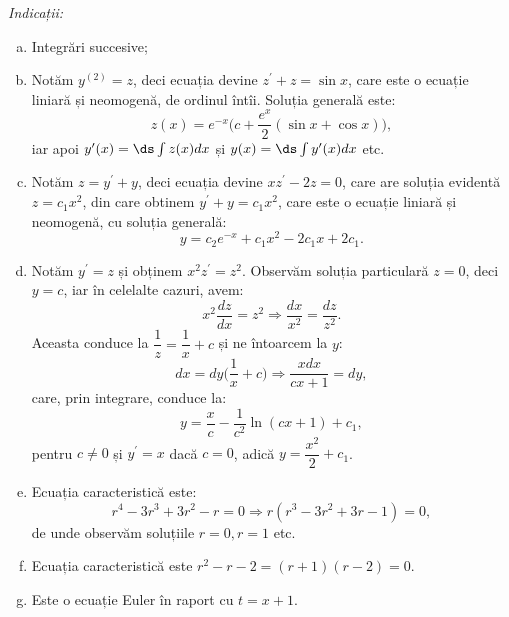 \emph{Indicații:}
\begin{enumerate}[(a)]
\item Integrări succesive;
\item Notăm $ y^{(2)} = z $, deci ecuația devine $ z^\prime + z = \sin x $, care este
  o ecuație liniară și neomogenă, de ordinul întîi. Soluția generală este:
  \[
    z(x) = e^{-x}\Big( c + \dfrac{e^x}{2} (\sin x + \cos x) \Big),
  \]
  iar apoi $ y^\prime(x) = \ds\int z(x) dx $ și $ y(x) = \ds\int y^\prime (x) dx $ etc.
\item Notăm $ z = y^\prime + y $, deci ecuația devine $ xz^\prime - 2z = 0 $, care
  are soluția evidentă $ z = c_1 x^2 $, din care obtinem $ y^\prime + y = c_1 x^2 $, care
  este o ecuație liniară și neomogenă, cu soluția generală:
  \[
    y = c_2 e^{-x} + c_1 x^2 - 2c_1 x + 2c_1.
  \]
\item Notăm $ y^\prime = z $ și obținem $ x^2 z^\prime = z^2 $. Observăm soluția particulară
  $ z = 0 $, deci $ y = c $, iar în celelalte cazuri, avem:
  \[
    x^2 \dfrac{dz}{dx} = z^2 \Rightarrow \dfrac{dx}{x^2} = \dfrac{dz}{z^2}.
  \]
  Aceasta conduce la $ \dfrac{1}{z} = \dfrac{1}{x} + c $ și ne întoarcem
  la $ y $:
  \[
    dx = dy \Big( \dfrac{1}{x} + c \Big) \Rightarrow \dfrac{xdx}{cx + 1} = dy,
  \]
  care, prin integrare, conduce la:
  \[
    y = \dfrac{x}{c} - \dfrac{1}{c^2} \ln(cx + 1) + c_1,
  \]
  pentru $ c \neq 0 $ și $ y^\prime = x $ dacă $ c = 0 $, adică $ y = \dfrac{x^2}{2} + c_1 $.
\item Ecuația caracteristică este:
  \[
    r^4 - 3r^3 + 3r^2 - r = 0 \Rightarrow r(r^3 - 3r^2 + 3r - 1) = 0,
  \]
  de unde observăm soluțiile $ r = 0, r = 1 $ etc.
\item Ecuația caracteristică este $ r^2 - r - 2 = (r + 1)(r - 2) = 0 $.
\item Este o ecuație Euler în raport cu $ t = x + 1 $.
\end{enumerate}


